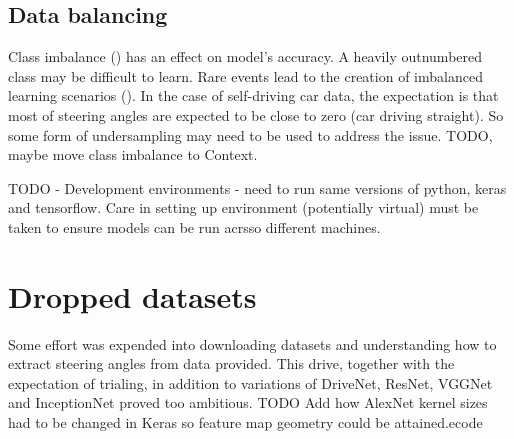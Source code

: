 \subsection{Data balancing}

Class imbalance (\cite{batista2004study}) has an effect on model's accuracy. A heavily outnumbered class may be difficult to learn. Rare events lead to the creation of imbalanced learning scenarios (\cite{krawczyk2016learning}). In the case of self-driving car data, the expectation is that most of steering angles are expected to be close to zero (car driving straight). So some form of undersampling may need to be used to address the issue.
TODO, maybe move class imbalance to Context.  
 
TODO - Development environments - need to run same versions of python, keras and tensorflow. Care in setting up environment (potentially virtual) must be taken to ensure models can be run acrsso different machines.
\section{Dropped datasets}
Some effort was expended into downloading datasets and understanding how to extract steering angles from data provided. This drive, together with the expectation of trialing, in addition to variations of DriveNet, ResNet, VGGNet and InceptionNet proved too ambitious.   
TODO Add how AlexNet kernel sizes had to be changed in Keras so feature map geometry could be attained.ecode




